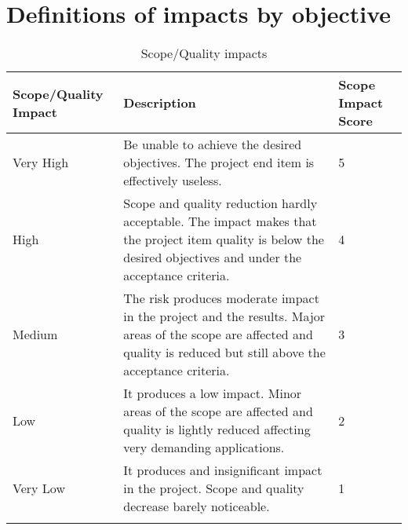 \section{Definitions of impacts by objective}

\begin{longtable}[H]{l >{\raggedright\arraybackslash}p{6.3cm} p{3.5cm}}
	
	\toprule[2pt]
	
	\textbf{Scope/Quality Impact} &  \textbf{Description}  & \textbf{Scope Impact Score} \\
	
	\midrule [1.5pt]
	\endhead
	
	Very High & Be unable to achieve the desired objectives. The project end item is effectively useless. & 5 
	\vspace{0.2cm} \\
	
	\midrule
	
	High & Scope and quality reduction hardly acceptable. The impact makes that the project item quality is below the desired objectives and under the acceptance criteria. & 4 
	\vspace{0.2cm} \\
	
	\midrule
	
	Medium & The risk produces moderate impact in the project and the results. Major areas of the scope are affected and quality is reduced but still above the acceptance criteria. & 3
	\vspace{0.2cm} \\

	\midrule

	Low & It produces a low impact. Minor areas of the scope are affected and quality is lightly reduced affecting very demanding applications. & 2
	\vspace{0.2cm} \\

	\midrule

	Very Low & It produces and insignificant impact in the project. Scope and quality decrease barely noticeable. & 1
	\vspace{0.2cm} \\
		
	\bottomrule[2pt]
	
	\caption{Scope/Quality impacts}

\end{longtable}




